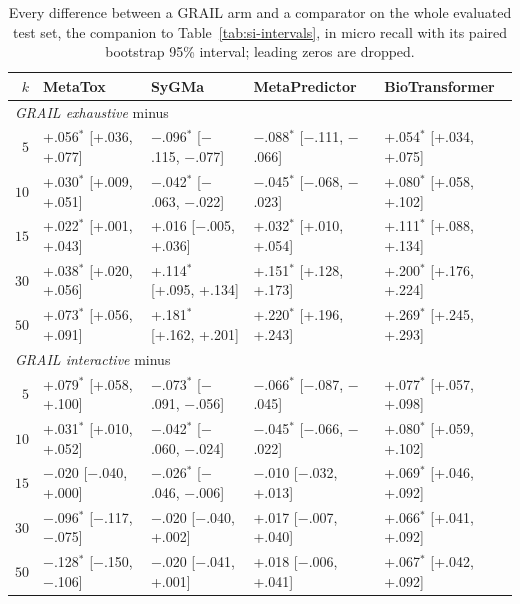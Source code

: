 \begin{table}[h]
\centering\scriptsize
\begin{threeparttable}
\caption{Every difference between a GRAIL arm and a comparator on the whole evaluated test set, the companion to Table~\ref{tab:si-intervals}, in micro recall with its paired bootstrap 95\% interval; leading zeros are dropped.}
\label{tab:si-intervals-whole}
\setlength{\tabcolsep}{2.5pt}
\begin{tabular}{rllll}
\toprule
$k$ & MetaTox & SyGMa & MetaPredictor & BioTransformer \\
\midrule
\multicolumn{5}{l}{\emph{GRAIL exhaustive} minus} \\
$5$ & +.056$^{*}$ [+.036, +.077] & $-$.096$^{*}$ [$-$.115, $-$.077] & $-$.088$^{*}$ [$-$.111, $-$.066] & +.054$^{*}$ [+.034, +.075] \\
$10$ & +.030$^{*}$ [+.009, +.051] & $-$.042$^{*}$ [$-$.063, $-$.022] & $-$.045$^{*}$ [$-$.068, $-$.023] & +.080$^{*}$ [+.058, +.102] \\
$15$ & +.022$^{*}$ [+.001, +.043] & +.016\phantom{$^{*}$} [$-$.005, +.036] & +.032$^{*}$ [+.010, +.054] & +.111$^{*}$ [+.088, +.134] \\
$30$ & +.038$^{*}$ [+.020, +.056] & +.114$^{*}$ [+.095, +.134] & +.151$^{*}$ [+.128, +.173] & +.200$^{*}$ [+.176, +.224] \\
$50$ & +.073$^{*}$ [+.056, +.091] & +.181$^{*}$ [+.162, +.201] & +.220$^{*}$ [+.196, +.243] & +.269$^{*}$ [+.245, +.293] \\
\midrule
\multicolumn{5}{l}{\emph{GRAIL interactive} minus} \\
$5$ & +.079$^{*}$ [+.058, +.100] & $-$.073$^{*}$ [$-$.091, $-$.056] & $-$.066$^{*}$ [$-$.087, $-$.045] & +.077$^{*}$ [+.057, +.098] \\
$10$ & +.031$^{*}$ [+.010, +.052] & $-$.042$^{*}$ [$-$.060, $-$.024] & $-$.045$^{*}$ [$-$.066, $-$.022] & +.080$^{*}$ [+.059, +.102] \\
$15$ & $-$.020\phantom{$^{*}$} [$-$.040, +.000] & $-$.026$^{*}$ [$-$.046, $-$.006] & $-$.010\phantom{$^{*}$} [$-$.032, +.013] & +.069$^{*}$ [+.046, +.092] \\
$30$ & $-$.096$^{*}$ [$-$.117, $-$.075] & $-$.020\phantom{$^{*}$} [$-$.040, +.002] & +.017\phantom{$^{*}$} [$-$.007, +.040] & +.066$^{*}$ [+.041, +.092] \\
$50$ & $-$.128$^{*}$ [$-$.150, $-$.106] & $-$.020\phantom{$^{*}$} [$-$.041, +.001] & +.018\phantom{$^{*}$} [$-$.006, +.041] & +.067$^{*}$ [+.042, +.092] \\
\bottomrule
\end{tabular}


\end{threeparttable}
\end{table}
